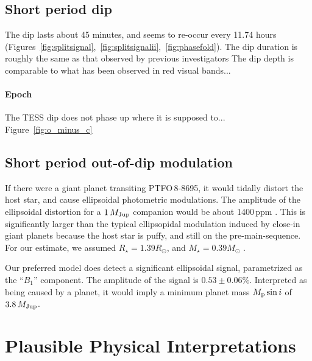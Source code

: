 \documentclass[12pt,twocolumn,tighten]{aastex62}
\newcommand{\ptfo}{PTFO$\,$8-8695}
\begin{document}
\subsection{Short period dip}
The dip lasts about 45 minutes, and seems to re-occur every 11.74
hours
(Figures~\ref{fig:splitsignal},~\ref{fig:splitsignalii},~\ref{fig:phasefold}).
The dip duration is roughly the same as that observed by previous
investigators \citep{van_eyken_ptf_2012,yu_tests_2015,}
The dip depth is comparable to what has been observed in red visual
bands...

\paragraph{Epoch}
The TESS dip does not phase up where it is supposed to...
Figure~\ref{fig:o_minus_c}

\subsection{Short period out-of-dip modulation}
If there were a giant planet transiting \ptfo, it would tidally
distort the host star, and cause ellipsoidal photometric modulations.
The amplitude of the ellipsoidal distortion for a $1\,M_{\rm Jup}$
companion would be about 1400$\,$ppm
\citep{shporer_astrophysics_2017}.  This is significantly larger than
the typical ellipsopidal modulation induced by close-in giant planets
because the host star is puffy, and still on the pre-main-sequence.
For our estimate, we assumed $R_\star = 1.39 R_\odot$, and $M_\star =
0.39 M_\odot$ \citep{van_eyken_ptf_2012}. 

Our preferred model does detect a significant ellipsoidal signal,
parametrized as the ``$B_1$'' component.  The amplitude of the signal
is $0.53 \pm 0.06\%$.  Interpreted as being caused by a planet, it
would imply a minimum planet mass $M_{\rm p} \sin i$ of $3.8\,M_{\rm
Jup}$.







\section{Plausible Physical Interpretations}
\end{document}
